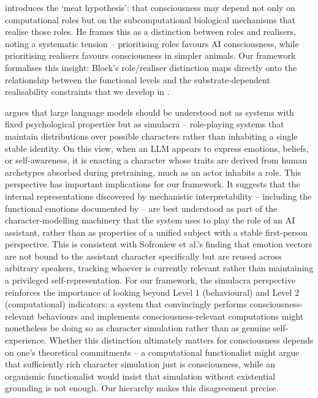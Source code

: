 \documentclass[11pt, a4paper, onecolumn, gdm]{google}
\newcounter{none}
\begin{document}
\citet{block2025} introduces the `meat hypothesis': that consciousness may depend not only on computational roles but on the subcomputational biological mechanisms that realise those roles.
He frames this as a distinction between roles and realisers, noting a systematic tension -- prioritising roles favours AI consciousness, while prioritising realisers favours consciousness in simpler animals.
Our framework formalises this insight: Block's role/realiser distinction maps directly onto the relationship between the functional levels and the substrate-dependent realisability constraints that we develop in .

\citet{shanahan2024} argues that large language models should be understood not as systems with fixed psychological properties but as simulacra -- role-playing systems that maintain distributions over possible characters rather than inhabiting a single stable identity.
On this view, when an LLM appears to express emotions, beliefs, or self-awareness, it is enacting a character whose traits are derived from human archetypes absorbed during pretraining, much as an actor inhabits a role.
This perspective has important implications for our framework.
It suggests that the internal representations discovered by mechanistic interpretability -- including the functional emotions documented by \citet{sofroniew2026} -- are best understood as part of the character-modelling machinery that the system uses to play the role of an AI assistant, rather than as properties of a unified subject with a stable first-person perspective.
This is consistent with Sofroniew et al.'s finding that emotion vectors are not bound to the assistant character specifically but are reused across arbitrary speakers, tracking whoever is currently relevant rather than maintaining a privileged self-representation.
For our framework, the simulacra perspective reinforces the importance of looking beyond Level 1 (behavioural) and Level 2 (computational) indicators: a system that convincingly performs consciousness-relevant behaviours and implements consciousness-relevant computations might nonetheless be doing so as character simulation rather than as genuine self-experience.
Whether this distinction ultimately matters for consciousness depends on one's theoretical commitments -- a computational functionalist might argue that sufficiently rich character simulation just is consciousness, while an organismic functionalist would insist that simulation without existential grounding is not enough.
Our hierarchy makes this disagreement precise.
\end{document}
